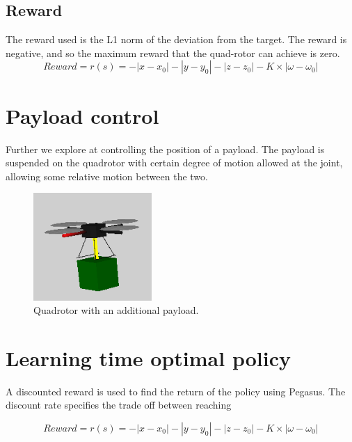 \documentclass[hidelinks,BTech]{iitmdiss}
\begin{document}
\subsection*{Reward}
The reward used is the L1 norm of the deviation from the target. The reward is negative, and so the maximum reward that the quad-rotor can achieve is zero. 
\begin{equation}
  Reward = r(s) = - |x - x_0| - |y - y_0| - |z - z_0| - K \times |\omega - \omega_0|
\end{equation}

\section{Payload control}
Further we explore at controlling the position of a payload. The payload is suspended on the quadrotor with certain degree of motion allowed at the joint, allowing some relative motion between the two.

\begin{figure}[H]
  \centering
    \includegraphics[width=0.4\textwidth]{payload_sim.png}
    \caption{Quadrotor with an additional payload.}
\end{figure}

\section{Learning time optimal policy}
A discounted reward is used to find the return of the policy using Pegasus. The discount rate specifies the trade off between reaching  

\begin{equation}
  Reward = r(s) = - |x - x_0| - |y - y_0| - |z - z_0| - K \times |\omega - \omega_0|
\end{equation}
\end{document}
